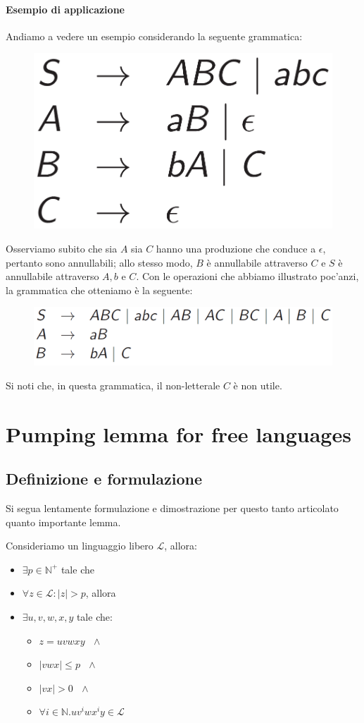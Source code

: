 \documentclass[class=book, crop=false, oneside, 12pt]{standalone}
\begin{document}
\paragraph{Esempio di applicazione}
Andiamo a vedere un esempio considerando la seguente grammatica:

\begin{figure}
  \centering
  \includegraphics[width=.3\textwidth,keepaspectratio]{ex-th-1-3-1_1}
\end{figure}

Osserviamo subito che sia \(A\) sia \(C\) hanno una produzione che conduce a \(\epsilon\), pertanto sono annullabili; allo stesso modo, \(B\) è annullabile attraverso \(C\) e \(S\) è annullabile attraverso \(A, b\) e \(C\). Con le operazioni che abbiamo illustrato poc'anzi, la grammatica che otteniamo è la seguente:

\begin{figure}
  \centering
  \includegraphics[width=.3\textwidth,keepaspectratio]{ex-th-1-3-1_2}
\end{figure}

Si noti che, in questa grammatica, il non-letterale \(C\) è non utile.

\section{Pumping lemma for free languages}

\subsection{Definizione e formulazione}

Si segua lentamente formulazione e dimostrazione per questo tanto articolato quanto importante lemma.

\begin{lemma}
  Consideriamo un linguaggio libero \(\mathcal{L}\), allora:
  \begin{itemize}
    \item \(\exists p \in \mathbb{N}^+\) tale che
    \item \(\forall z \in \mathcal{L} : |z| > p\), allora
    \item \(\exists u, v, w, x, y\) tale che:
    \begin{itemize}
      \item \(z = uvwxy \textrm{ } \land\)
      \item \(|vwx| \leq p \textrm{ } \land\)
      \item \(|vx| > 0 \textrm{ }\land\)
      \item \(\forall i \in \mathbb{N}.uv^iwx^iy \in \mathcal{L}\)
    \end{itemize}
  \end{itemize}
\end{lemma}
\end{document}

